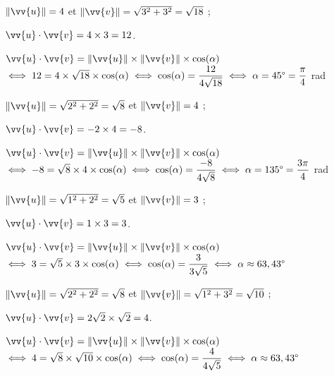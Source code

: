 \documentclass[11pt,a4paper]{article}  %
\begin{document}
\begin{corrBox}
	\begin{enumMet}
		\item \begin{enumMet}
			\item $\|\vv{u}\|=4$ et $\|\vv{v}\|=\sqrt{3^2+3^2}=\sqrt{18}$ ;
			\item $\vv{u} \cdot \vv{v}=4\times3=12$.
			\item $\vv{u} \cdot \vv{v}=\|\vv{u}\|\times\|\vv{v}\|\times \cos(\alpha)$\\
			$\iff 12=4\times\sqrt{18}\times\cos(\alpha)\iff \cos(\alpha)=\dfrac{12}{4\sqrt{18}}\iff \alpha=45\degree=\dfrac{\pi}{4}$ rad
		\end{enumMet}
		\item \begin{enumMet}
			\item $\|\vv{u}\|=\sqrt{2^2+2^2}=\sqrt{8}$ et $\|\vv{v}\|=4$ ;
			\item $\vv{u} \cdot \vv{v}=-2\times4=-8$.
			\item $\vv{u} \cdot \vv{v}=\|\vv{u}\|\times\|\vv{v}\|\times \cos(\alpha)$\\
			$\iff -8=\sqrt{8}\times4\times\cos(\alpha)\iff \cos(\alpha)=\dfrac{-8}{4\sqrt{8}}\iff \alpha=135\degree=\dfrac{3\pi}{4}$ rad
		\end{enumMet}
		\item \begin{enumMet}
			\item $\|\vv{u}\|=\sqrt{1^2+2^2}=\sqrt{5}$ et $\|\vv{v}\|=3$ ;
			\item $\vv{u} \cdot \vv{v}=1\times3=3$.
			\item $\vv{u} \cdot \vv{v}=\|\vv{u}\|\times\|\vv{v}\|\times \cos(\alpha)$\\
			$\iff 3=\sqrt{5}\times3\times\cos(\alpha)\iff \cos(\alpha)=\dfrac{3}{3\sqrt{5}}\iff \alpha\approx63,43\degree$
		\end{enumMet}
		\item \begin{enumMet}
			\item $\|\vv{u}\|=\sqrt{2^2+2^2}=\sqrt{8}$ et $\|\vv{v}\|=\sqrt{1^2+3^2}=\sqrt{10}$ ;
			\item $\vv{u} \cdot \vv{v}=2\sqrt{2}\times\sqrt{2}=4$.
			\item $\vv{u} \cdot \vv{v}=\|\vv{u}\|\times\|\vv{v}\|\times \cos(\alpha)$\\
			$\iff 4=\sqrt{8}\times\sqrt{10}\times\cos(\alpha)\iff \cos(\alpha)=\dfrac{4}{4\sqrt{5}}\iff \alpha\approx63,43\degree$
		\end{enumMet}
	\end{enumMet}
\end{corrBox}
\end{document}
